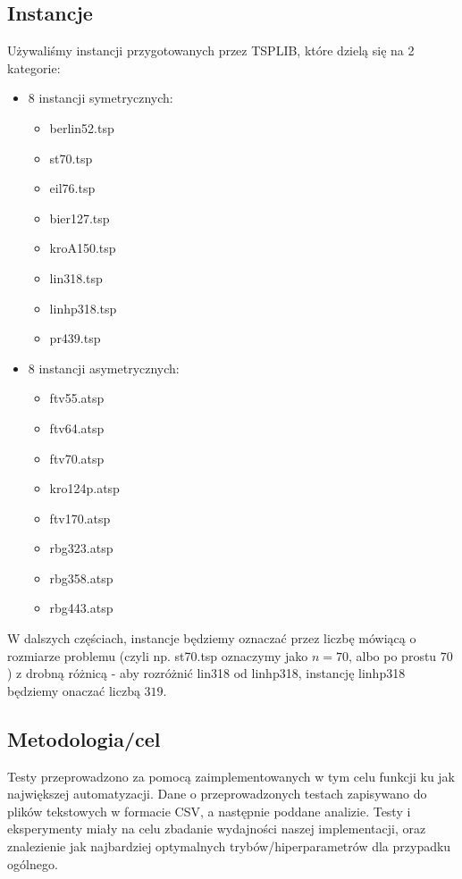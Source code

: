 \documentclass{article}
\begin{document}
\subsection{Instancje}
Używaliśmy instancji przygotowanych przez TSPLIB, które dzielą się na 2 kategorie:
\begin{itemize}
	\item 8 instancji symetrycznych:
		\begin{itemize}
			\item berlin52.tsp
			\item st70.tsp
			\item eil76.tsp
			\item bier127.tsp
			\item kroA150.tsp
			\item lin318.tsp
			\item linhp318.tsp
			\item pr439.tsp
		\end{itemize}
	\item 8 instancji asymetrycznych:
		\begin{itemize}
			\item ftv55.atsp
			\item ftv64.atsp
			\item ftv70.atsp
			\item kro124p.atsp
			\item ftv170.atsp
			\item rbg323.atsp
			\item rbg358.atsp
			\item rbg443.atsp
		\end{itemize}
\end{itemize}

W dalszych częściach, instancje będziemy oznaczać przez liczbę mówiącą o rozmiarze problemu (czyli np. st70.tsp oznaczymy jako $n = 70$, albo po prostu $70$) z drobną różnicą - aby rozróżnić lin318 od linhp318, instancję linhp318 będziemy onaczać liczbą $319$.

\subsection{Metodologia/cel}

Testy przeprowadzono za pomocą zaimplementowanych w tym celu funkcji ku jak największej automatyzacji. Dane o przeprowadzonych testach zapisywano do plików tekstowych w formacie CSV, a następnie poddane analizie. Testy i eksperymenty miały na celu zbadanie wydajności naszej implementacji, oraz znalezienie jak najbardziej optymalnych trybów/hiperparametrów dla przypadku ogólnego.
\end{document}
